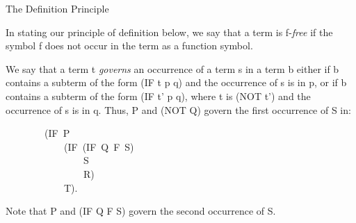 \documentclass[10pt]{book}
\newenvironment{pubasis}{\begin{flushleft}}{\end{flushleft}}
\begin{document}
\hrulefill 

\begin{center}
The Definition Principle
\end{center}

In stating our principle of definition below, we  say that
a term is f-\emph{free} if the symbol f does not occur in the term as
a function symbol.

We say that a term t \emph{governs} an occurrence of a term s
in a term b either if b contains a subterm of the form (IF t p q)
and the occurrence of s is in p, or if b contains a subterm of the form
(IF t' p q), where t is (NOT t')
and the occurrence of s is in q.  Thus, P and (NOT Q) govern the first
occurrence of S in:
\begin{pubasis}
~~~~~~~~(IF~P\\
~~~~~~~~~~~~(IF~(IF~Q~F~S)\\
~~~~~~~~~~~~~~~~S\\
~~~~~~~~~~~~~~~~R)\\
~~~~~~~~~~~~T).\\
\end{pubasis}
Note that P and (IF Q F S) govern the second occurrence of S.
\end{document}

